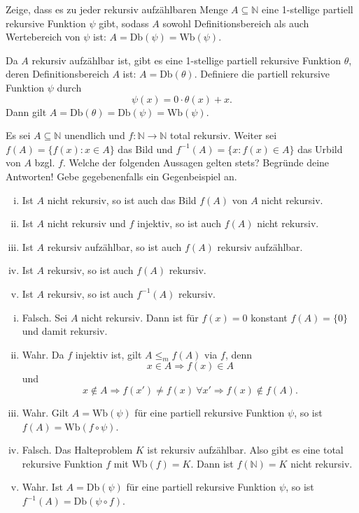\documentclass[german,headsepline]{scrartcl}
\theoremstyle{definition}
\begin{document}
	\begin{question}[subtitle={Klausur 2009}]
		Zeige, dass es zu jeder rekursiv aufzählbaren Menge $A\subseteq\mathbb{N}$ eine 1-stellige partiell rekursive Funktion $\psi$ gibt,
		sodass $A$ sowohl Definitionsbereich als auch Wertebereich von $\psi$ ist: $A=\text{Db}(\psi)=\text{Wb}(\psi)$.
	\end{question}
	\begin{solution}
		Da $A$ rekursiv aufzählbar ist, gibt es eine 1-stellige partiell rekursive Funktion $\theta$,
		deren Definitionsbereich $A$ ist: $A=\text{Db}(\theta)$.
		Definiere die partiell rekursive Funktion $\psi$ durch
		\[\psi(x)=0\cdot\theta(x)+x.\]
		Dann gilt $A=\text{Db}(\theta)=\text{Db}(\psi)=\text{Wb}(\psi)$.
	\end{solution}
	
	\begin{question}[subtitle={Klausur 2009}]
		Es sei $A\subseteq\mathbb{N}$ unendlich und $f:\mathbb{N}\to\mathbb{N}$ total rekursiv.
		Weiter sei $f(A)=\{f(x)\colon x\in A\}$ das Bild und $f^{-1}(A)=\{x\colon f(x)\in A\}$ das Urbild von $A$ bzgl. $f$.
		Welche der folgenden Aussagen gelten stets?
		Begründe deine Antworten! Gebe gegebenenfalls ein Gegenbeispiel an.
		\begin{enumerate}[(i)]
			\item Ist $A$ nicht rekursiv, so ist auch das Bild $f(A)$ von $A$ nicht rekursiv.
			\item Ist $A$ nicht rekursiv und $f$ injektiv, so ist auch $f(A)$ nicht rekursiv.
			\item Ist $A$ rekursiv aufzählbar, so ist auch $f(A)$ rekursiv aufzählbar.
			\item Ist $A$ rekursiv, so ist auch $f(A)$ rekursiv.
			\item Ist $A$ rekursiv, so ist auch $f^{-1}(A)$ rekursiv.
		\end{enumerate}
	\end{question}
	\begin{solution}
		\begin{enumerate}[(i)]
			\item Falsch. Sei $A$ nicht rekursiv. Dann ist für $f(x)=0$ konstant $f(A)=\{0\}$ und damit rekursiv.
			\item Wahr. Da $f$ injektiv ist, gilt $A\leq_mf(A)$ via $f$, denn
				\[x\in A\Rightarrow f(x)\in A\]
				und
				\[x\notin A\Rightarrow f(x')\neq f(x)~\forall x'\Rightarrow f(x)\notin f(A).\]
			\item Wahr. Gilt $A=\text{Wb}(\psi)$ für eine partiell rekursive Funktion $\psi$, so ist $f(A)=\text{Wb}(f\circ\psi)$.
			\item Falsch. Das Halteproblem $K$ ist rekursiv aufzählbar.
				Also gibt es eine total rekursive Funktion $f$ mit $\text{Wb}(f)=K$.
				Dann ist $f(\mathbb{N})=K$ nicht rekursiv.
			\item Wahr. Ist $A=\text{Db}(\psi)$ für eine partiell rekursive Funktion $\psi$, so ist $f^{-1}(A)=\text{Db}(\psi\circ f)$.
		\end{enumerate}
	\end{solution}
	
\end{document}
